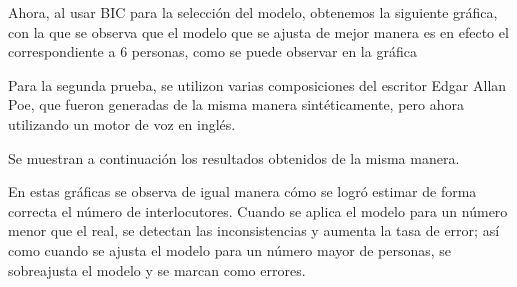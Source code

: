Ahora, al usar BIC para la selección del modelo, obtenemos la siguiente gráfica, con la que se observa que el modelo que se ajusta de mejor manera es en efecto el correspondiente a 6 personas, como se puede observar en la gráfica 

Para la segunda prueba, se utilizon varias composiciones del escritor Edgar Allan Poe, que fueron generadas de la misma manera sintéticamente, pero ahora utilizando un motor de voz en inglés.

Se muestran a continuación los resultados obtenidos de la misma manera.

En estas gráficas se observa de igual manera cómo se logró estimar de forma correcta el número de interlocutores. Cuando se aplica el modelo para un número menor que el real, se detectan las inconsistencias y aumenta la tasa de error; así como cuando se ajusta el modelo para un número mayor de personas, se sobreajusta el modelo y se marcan como errores.

